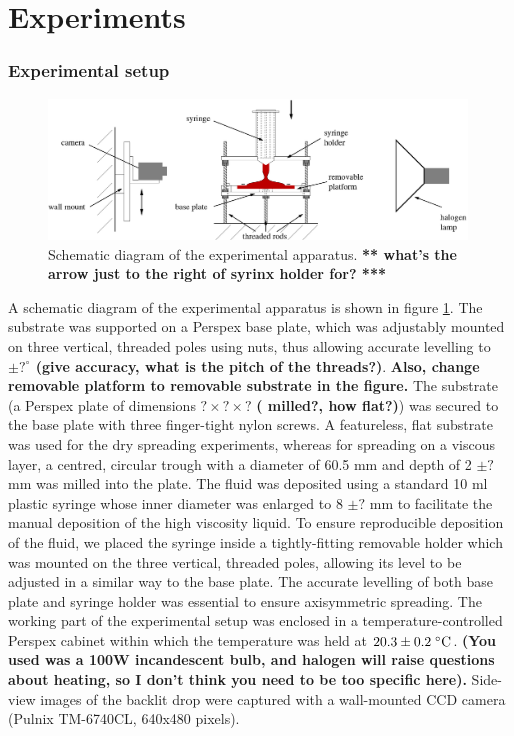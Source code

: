 \documentclass[aip,graphicx]{revtex4-1}
\begin{document}
\section{Experiments}
\label{sec:experiments}

\subsubsection{Experimental setup}
\label{setup}

\begin{figure}[!h]
\centering
\includegraphics[width=0.99\textwidth]{figures/experimental_apparatus.eps}
\caption{Schematic diagram of the experimental apparatus.
{\bf *** what's the arrow just to the right of syrinx holder for? ***}}
\label{fig:experimental_apparatus}
\end{figure}

A schematic diagram of the experimental apparatus is
shown in figure \ref{fig:experimental_apparatus}.  The substrate was
supported on a Perspex base plate, which was adjustably mounted on
three vertical, threaded poles using nuts, thus allowing accurate
levelling to {\bf $\pm ?^\circ$ (give accuracy, what is the pitch of
  the threads?)}. {\bf Also, change removable platform to removable
  substrate in the figure.} The substrate (a Perspex plate of
dimensions {\bf $? \times ? \times ?$} {\bf( milled?, how flat?)})
was secured to the base plate with three finger-tight nylon screws. A
featureless, flat substrate was used for the dry spreading
experiments, whereas for spreading on a viscous layer, a centred,
circular trough with a diameter of 60.5 mm and depth of 2 {\bf $\pm
  ?$} mm was milled into the plate.  The fluid was deposited using a
standard 10 ml plastic syringe whose inner diameter was enlarged 
to 8 {\bf $\pm ?$} mm to facilitate the manual deposition of the high
viscosity liquid. To ensure reproducible deposition of the
fluid, we placed the syringe inside a tightly-fitting removable
holder which was mounted on the three vertical, threaded poles, 
allowing its level to be adjusted in a similar way to the base plate. The
accurate levelling of both base plate and syringe holder was essential
to ensure axisymmetric spreading. The working part of the experimental 
setup was enclosed in a temperature-controlled Perspex cabinet within which the 
temperature was held at $20.3 \pm 0.2 \; ^{\circ} \text{C}$.
{\bf (You used was a 100W incandescent bulb, and halogen will raise
  questions about heating, so I don't think you need to be too
  specific here).}
Side-view images of the backlit drop were captured with a wall-mounted 
CCD camera (Pulnix TM-6740CL, 640x480 pixels). 
\end{document}
